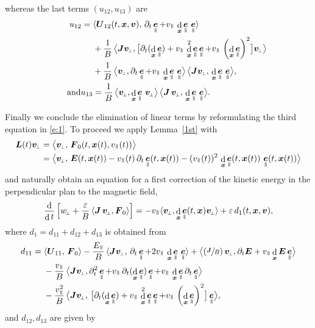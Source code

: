 \documentclass[JEP,XML,SOM,Unicode]{cedram}
\newcommand{\sperp}{{\scriptscriptstyle\perp}}
\newcommand{\blangle}{\bigl\langle}
\newcommand{\brangle}{\bigr\rangle}
\newcommand{\Psfrac}[2]{(\sfrac{#1}{#2})}
\let\eps\varepsilon
\let\d\partial
\DeclareMathOperator\dD{d}\let\dd\dD
\theoremstyle{plain}
\theoremstyle{definition}
\newcommand{\be}{\begin{equation}}
\newcommand{\ee}{\end{equation}}
\newcommand\bE{{\boldsymbol E}}
\newcommand\bF{{\boldsymbol F}}
\newcommand\bJ{{\boldsymbol J}}
\newcommand\bL{{\boldsymbol L}}
\newcommand\bU{{\boldsymbol U}}
\newcommand\bfv{{\boldsymbol v}}
\newcommand\bfx{{\boldsymbol x}}
\DeclareMathOperator{\beD}{\boldsymbol{e}}
\newcommand\eDpar{\beD_\mypar}
\newcommand\vpar{v_\mypar}
\newcommand\bvperp{\bfv_{\!\sperp}}
\newcommand\eperp{w_{\!\sperp}}
\newcommand\Epar{E_\mypar}
\newcommand{\mypar}{{\mkern3mu\vphantom{\perp}\vrule depth 0pt\mkern2mu\vrule depth 0pt\mkern3mu}}
\begin{document}
whereas the last terms $(u_{12},u_{13})$ are
\begin{align*}
u_{12}={}& \langle\bU_{12}(t,\bfx,\bfv),\,\d_t\eDpar+\vpar\,\dD_{\bfx}\eDpar\,\eDpar\rangle
\\
&+\frac{1}{B}\, \blangle
\bJ\bvperp,\bigl[\d_t(\dD_\bfx\eDpar)+\vpar\,\dD_{\bfx}^2\eDpar\eDpar+\vpar\,\left(\dD_{\bfx}\eDpar\right)^2\bigr]\bvperp \brangle
\\
&+ \frac{1}{B} \, \blangle \bvperp,\d_t\eDpar+\vpar\,\dD_{\bfx}\eDpar\,\eDpar\brangle\,
\blangle \bJ\bvperp,\, \dD_{\bfx}\eDpar\,\eDpar\brangle,\\
\tag*{and}
u_{13}&=
\frac{1}{B} \, \blangle \bvperp, \dD_{\bfx}\eDpar\,\bvperp\brangle\,
\blangle{\bJ}\,\bvperp,\, \dD_{\bfx}\eDpar\,\eDpar\brangle.
\end{align*}

Finally we conclude the elimination of linear terms by reformulating the third equation in \eqref{e:1}. To proceed we apply Lemma~\ref{1st} with
\begin{align*}
\bL(t)\bvperp&=\blangle \bvperp,\,\bF_0(t,\bfx(t),\vpar(t))\brangle\\
&=\blangle \bvperp,\,\bE(t,\bfx(t))
-\vpar(t)\,\d_t\eDpar(t,\bfx(t))
-(\vpar(t))^2\,\dD_{\bfx}\eDpar(t,\bfx(t))\, \eDpar(t,\bfx(t))\brangle
\end{align*}
and naturally obtain an equation for a first correction of the kinetic energy in
the perpendicular plan to the magnetic field,
\be
\label{e:ep}
\frac{\dD}{\dD t}\left[\eperp + \frac{\eps}{B}\,\langle
{\bJ}\,\bvperp,\bF_0\rangle
\right] =
-\vpar\langle\bvperp,
\dD_{\bfx}\eDpar(t,\bfx)\bvperp\rangle+\eps \,d_1(t,\bfx,\bfv),
\ee
where $d_1=d_{11}+d_{12}+d_{13}$ is obtained from
\begin{align*}
d_{11} ={}& \langle \bU_{11},\,\bF_0\rangle
- \frac{\Epar}{B}\,\langle
{\bJ}\bvperp,\,\d_t\eDpar+2\vpar\,\dD_{\bfx}\eDpar\,\eDpar\rangle
+ \blangle
\Psfrac{\bJ}{B}\,\bvperp,\d_t\bE+ \vpar\dD_\bfx\bE\eDpar\brangle
\\
&-\frac{\vpar}{B}\, \blangle
\bJ\bvperp,\d_t^2\eDpar+\vpar\,\d_t(\dD_{\bfx}\eDpar)\eDpar+\vpar\,\dD_{\bfx}\eDpar\d_t\eDpar\brangle
\\
&-
\frac{\vpar^2}{B}\, \blangle\bJ\bvperp,\,
\bigl[\d_t(\dD_\bfx\eDpar)+\vpar\,\dD_{\bfx}^2\eDpar\eDpar+\vpar\,\left(\dD_{\bfx}\eDpar\right)^2\bigr]\eDpar
\brangle,
\end{align*}
and $d_{12},d_{13}$ are given by
\end{document}
